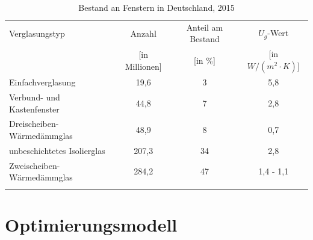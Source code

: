 \begin{table}[H]\centering
\begin{tabular}{lccc}
\toprule[1.5pt]
Verglasungstyp & Anzahl & Anteil am Bestand & \(U_g\)-Wert \\
 & [in Millionen] & [in \%] & [in \(W/(m^2 \cdot K)\)] \\ \addlinespace[5pt]
\midrule[2pt]
Einfachverglasung & 19,6 & 3 & 5,8 \\
\midrule
Verbund- und Kastenfenster & 44,8 & 7 & 2,8 \\
\midrule
Dreischeiben-Wärmedämmglas & 48,9 & 8 & 0,7 \\
\midrule
unbeschichtetes Isolierglas & 207,3 & 34 & 2,8 \\
\midrule
Zweischeiben-Wärmedämmglas & 284,2 & 47 & 1,4 - 1,1 \\
\bottomrule[1.5pt] \addlinespace[10pt]
\end{tabular}
\caption{Bestand an Fenstern in Deutschland, 2015 \cite{Bigalke.2016}}
\label{tab: Tabelle231}
\end{table}


\section{Optimierungsmodell}
\label{sec:Sektion 24}




